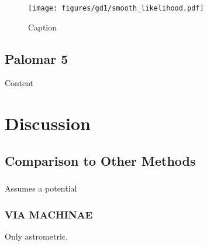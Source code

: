 \documentclass[twocolumn]{aastex631}
\begin{document}
            \begin{figure}
                \centering
                \texttt{[image: figures/gd1/smooth\_likelihood.pdf]}
                \caption{Caption}
                \label{fig:gd1-heatmap}
            \end{figure}




    \subsection{Palomar 5} \label{sub:pal5}

        Content



\section{Discussion}


    \subsection{Comparison to Other Methods} \label{sec:comparison}

        \subsubsection[STREAMFINDER]{\cite{2018MNRAS.477.4063M}}
    
            Assumes a potential
    
    
        \subsubsection{VIA MACHINAE}{\cite{2022MNRAS.509.5992S}}

            Only astrometric.
    
    
        \subsubsection[Uniform Modeling of 13 Stellar Streams]{\cite{PatrickEtAl2022}}
\end{document}
